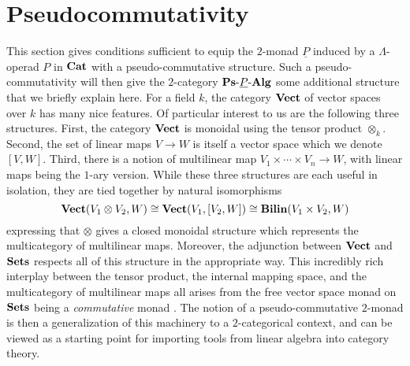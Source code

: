 \section{Pseudocommutativity}\label{sec:pscomm}


This section gives conditions sufficient to equip the $2$-monad $\underline{P}$ induced by a $\Lambda$-operad $P$ in $\mathbf{Cat}$ with a pseudo-commutative structure. Such a pseudo-commutativity will then give the $2$-category $\mathbf{Ps}\mbox{-}\underline{P}\mbox{-}\mathbf{Alg}$ some additional structure that we briefly explain here. For a field $k$, the category $\mathbf{Vect}$ of vector spaces over $k$ has many nice features. Of particular interest to us are the following three structures. First, the category $\mathbf{Vect}$ is monoidal using the tensor product $\otimes_{k}$. Second, the set of linear maps $V \rightarrow W$ is itself a vector space which we denote $[V,W]$. Third, there is a notion of multilinear map $V_{1} \times \cdots \times V_{n} \rightarrow W$, with linear maps being the $1$-ary version. While these three structures are each useful in isolation, they are tied together by natural isomorphisms
  \[
    \mathbf{Vect}(V_{1} \otimes V_{2}, W) \cong \mathbf{Vect}(V_{1}, [V_{2}, W]) \cong \mathbf{Bilin}(V_{1} \times V_{2}, W)
  \]
expressing that $\otimes$ gives a closed monoidal structure which represents the multicategory of multilinear maps. Moreover, the adjunction between $\mathbf{Vect}$ and $\mathbf{Sets}$ respects all of this structure in the appropriate way. This incredibly rich interplay between the tensor product, the internal mapping space, and the multicategory of multilinear maps all arises from the free vector space monad on $\mathbf{Sets}$ being a \textit{commutative} monad \cite{kock-monads, kock-closed, kock-strong}. The notion of a pseudo-commutative $2$-monad \cite{HP} is then a generalization of this machinery to a $2$-categorical context, and can be viewed as a starting point for importing tools from linear algebra into category theory.

